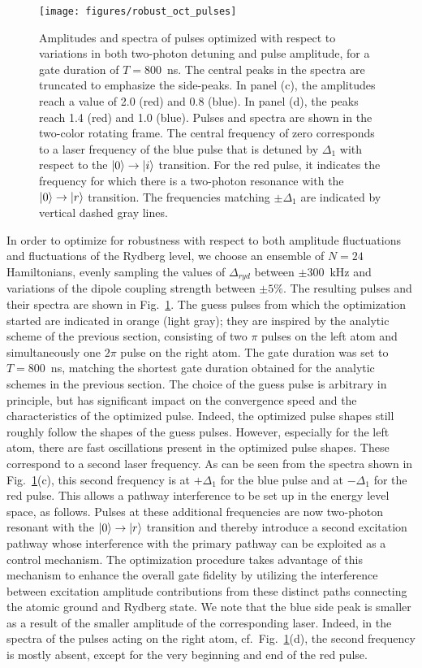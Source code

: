 \begin{figure}[htb]
  \centering
  \texttt{[image: figures/robust\_oct\_pulses]}
  \caption{%
  Amplitudes and spectra of pulses optimized with respect to variations
  in both two-photon detuning and pulse amplitude, for a gate duration of
  $T=800$~ns. The central peaks in the
  spectra are truncated to emphasize the side-peaks.
  In panel (c),
  the amplitudes reach a value of 2.0 (red) and 0.8 (blue). In panel (d), the
  peaks reach 1.4 (red) and 1.0 (blue). Pulses and
  spectra are shown in the two-color rotating frame. The central frequency of
  zero corresponds to a laser frequency of the blue pulse that is detuned by
  $\Delta_1$ with respect to the $\Ket{0} \rightarrow \Ket{i}$ transition. For
  the red pulse, it indicates the frequency for which there is a two-photon
  resonance with the $\Ket{0} \rightarrow \Ket{r}$ transition.
  The frequencies matching $\pm \Delta_1$ are indicated by vertical dashed gray
  lines.
  }
  \label{fig:octpulses}
\end{figure}
In order to optimize for robustness with respect to both amplitude fluctuations
and fluctuations of the Rydberg level, we choose an ensemble of $N=24$
Hamiltonians, evenly sampling the values of $\Delta_{ryd}$ between $\pm
300$~kHz and variations of the dipole coupling strength between $\pm 5\%$.
The resulting pulses and their spectra are shown in Fig.~\ref{fig:octpulses}.
The guess pulses from which the optimization started are indicated in orange
(light gray);
they are inspired by the analytic scheme of the previous section,
consisting of two $\pi$ pulses on the left atom and simultaneously one $2\pi$
pulse on the right atom. The gate duration was set to $T=800$~ns, matching the
shortest gate duration obtained for the analytic schemes in the previous
section.
The choice of the guess pulse is arbitrary in principle,
but has significant impact on the convergence speed and the characteristics of
the optimized pulse. Indeed, the optimized pulse shapes still roughly follow
the shapes of the guess pulses. However, especially for the left atom, there are
fast oscillations present in
the optimized pulse shapes. These correspond to a second laser
frequency. As can be seen from the spectra shown in
Fig.~\ref{fig:octpulses}(c), this second
frequency is at $+\Delta_1$ for the blue pulse and at $-\Delta_1$ for the red
pulse. This 
allows a pathway interference to be set up in the energy level space, as follows.
Pulses at these additional frequencies are now two-photon resonant with
the $\Ket{0} \rightarrow \Ket{r}$ transition and thereby introduce a second excitation pathway whose
interference with the primary pathway can be exploited as a control mechanism. The optimization procedure
takes advantage of this mechanism to enhance the overall gate fidelity by utilizing the interference between
excitation amplitude contributions from these distinct paths connecting the atomic ground and Rydberg state.
We note that the blue side peak is smaller as a result of the smaller amplitude of the corresponding laser.
Indeed, in the spectra of the pulses acting on the right atom,
cf.\ Fig.~\ref{fig:octpulses}(d),
the second frequency is mostly absent, except for the very beginning and end of
the red pulse.


